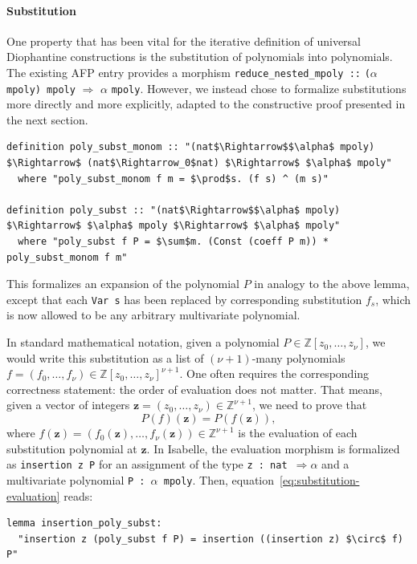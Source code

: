 \documentclass[a4paper,USenglish,cleveref,autoref,thm-restate]{lipics-v2021}
\newcommand{\Z}{{\mathbb Z}}
\begin{document}
\paragraph*{Substitution}
One property that has been vital for the iterative definition of universal Diophantine constructions is the substitution of polynomials into polynomials. The existing AFP entry provides a morphism \texttt{reduce\_nested\_mpoly ::} \texttt($\alpha$ \texttt{mpoly) mpoly} $\Rightarrow$ $\alpha$ \texttt{mpoly}. However, we instead chose to formalize substitutions more directly and more explicitly, adapted to the constructive proof presented in the next section.

\begin{lstlisting}
definition poly_subst_monom :: "(nat$\Rightarrow$$\alpha$ mpoly) $\Rightarrow$ (nat$\Rightarrow_0$nat) $\Rightarrow$ $\alpha$ mpoly"
  where "poly_subst_monom f m = $\prod$s. (f s) ^ (m s)"

definition poly_subst :: "(nat$\Rightarrow$$\alpha$ mpoly) $\Rightarrow$ $\alpha$ mpoly $\Rightarrow$ $\alpha$ mpoly"
  where "poly_subst f P = $\sum$m. (Const (coeff P m)) * poly_subst_monom f m"
\end{lstlisting}
This formalizes an expansion of the polynomial $P$ in analogy to the above lemma, except that each \texttt{Var s} has been replaced by corresponding substitution $f_s$, which is now allowed to be any arbitrary multivariate polynomial. 

In standard mathematical notation, given a polynomial $P \in \Z[z_0, \ldots, z_\nu]$, we would write this substitution as a list of $(\nu+1)$-many polynomials $f = (f_0, \ldots, f_\nu) \in \Z[z_0, \ldots, z_\nu]^{\nu+1}$. One often requires the corresponding correctness statement: the order of evaluation does not matter. That means, given a vector of integers $\mathbf{z} = (z_0, \ldots, z_\nu) \in \Z^{\nu+1}$, we need to prove that
\begin{equation}\label{eq:substitution-evaluation}
    P(f)(\mathbf{z}) = P(f(\mathbf{z})),
\end{equation}
where $f(\mathbf{z}) = (f_0(\mathbf{z}), \ldots, f_\nu(\mathbf{z})) \in \Z^{\nu+1}$ is the evaluation of each substitution polynomial at $\mathbf{z}$. In Isabelle, the evaluation morphism is formalized as \texttt{insertion z P} for an assignment of the type \texttt{z :\!\!\! nat $\Rightarrow \alpha$} and a multivariate polynomial \texttt{P :\! $\alpha$ mpoly}. Then, equation~\eqref{eq:substitution-evaluation} reads:
\begin{lstlisting}
lemma insertion_poly_subst:
  "insertion z (poly_subst f P) = insertion ((insertion z) $\circ$ f) P"
\end{lstlisting}
\end{document}
